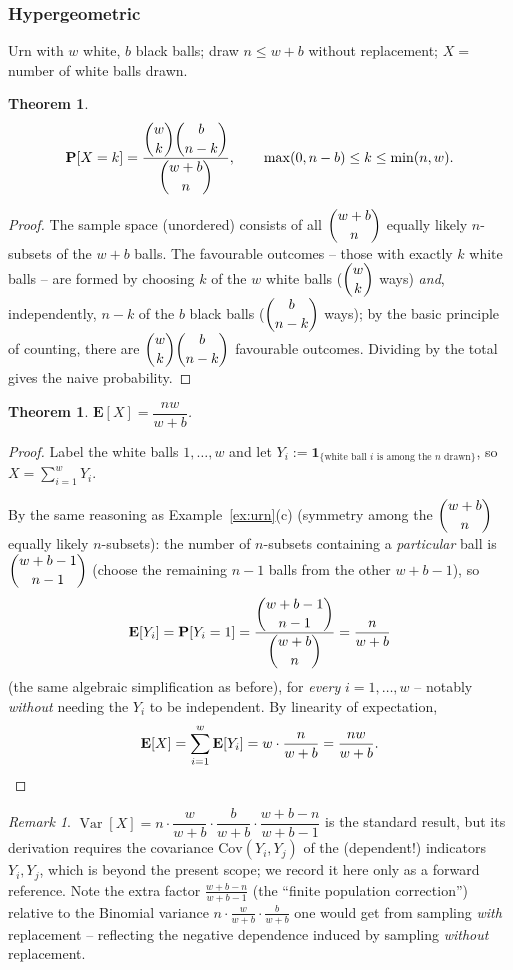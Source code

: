 \documentclass[11pt]{article}
\theoremstyle{definition}
\theoremstyle{plain}
\newtheorem{theorem}[definition]{Theorem}
\theoremstyle{remark}
\newtheorem{remark}[definition]{Remark}
\newcommand{\E}[1]{\mathbf{E}\!\left[#1\right]}
\newcommand{\Var}[1]{\operatorname{Var}\!\left[#1\right]}
\begin{document}
\subsubsection{Hypergeometric}

Urn with $w$ white, $b$ black balls; draw $n\le w+b$ without replacement; $X=$ number of white
balls drawn.

\begin{theorem}
\[
\mathbf{P}[X=k] = \frac{\dbinom{w}{k}\dbinom{b}{n-k}}{\dbinom{w+b}{n}}, \qquad
\max(0,n-b)\le k \le \min(n,w).
\]
\end{theorem}
\begin{proof}
The sample space (unordered) consists of all $\dbinom{w+b}{n}$ equally likely $n$-subsets of the
$w+b$ balls. The favourable outcomes -- those with exactly $k$ white balls -- are formed by
choosing $k$ of the $w$ white balls ($\dbinom{w}{k}$ ways) \emph{and}, independently, $n-k$ of the
$b$ black balls ($\dbinom{b}{n-k}$ ways); by the basic principle of counting, there are
$\dbinom{w}{k}\dbinom{b}{n-k}$ favourable outcomes. Dividing by the total gives the naive
probability.
\end{proof}

\begin{theorem}
$\E{X} = \dfrac{nw}{w+b}$.
\end{theorem}
\begin{proof}
Label the white balls $1,\dots,w$ and let $Y_i := \mathbf{1}_{\{\text{white ball } i \text{ is
among the } n \text{ drawn}\}}$, so $X = \sum_{i=1}^w Y_i$.

By the same reasoning as Example~\ref{ex:urn}(c) (symmetry among the $\dbinom{w+b}{n}$ equally
likely $n$-subsets): the number of $n$-subsets containing a \emph{particular} ball is
$\dbinom{w+b-1}{n-1}$ (choose the remaining $n-1$ balls from the other $w+b-1$), so
\[
\E{Y_i} = \mathbf{P}[Y_i=1] = \frac{\dbinom{w+b-1}{n-1}}{\dbinom{w+b}{n}} = \frac{n}{w+b}
\]
(the same algebraic simplification as before), for \emph{every} $i=1,\dots,w$ -- notably
\emph{without} needing the $Y_i$ to be independent. By linearity of expectation,
\[
\E{X} = \sum_{i=1}^w \E{Y_i} = w\cdot\frac{n}{w+b} = \frac{nw}{w+b}. \qedhere
\]
\end{proof}

\begin{remark}
$\Var{X} = n\cdot\dfrac{w}{w+b}\cdot\dfrac{b}{w+b}\cdot\dfrac{w+b-n}{w+b-1}$ is the standard result,
but its derivation requires the covariance $\mathrm{Cov}(Y_i,Y_j)$ of the (dependent!) indicators
$Y_i,Y_j$, which is beyond the present scope; we record it here only as a forward reference. Note
the extra factor $\frac{w+b-n}{w+b-1}$ (the ``finite population correction'') relative to the
Binomial variance $n\cdot\frac{w}{w+b}\cdot\frac{b}{w+b}$ one would get from sampling \emph{with}
replacement -- reflecting the negative dependence induced by sampling \emph{without} replacement.
\end{remark}
\end{document}
